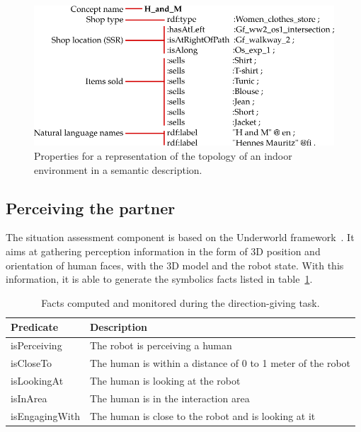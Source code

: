 \documentclass[a4paper,11pt,twoside]{StyleThese}
\begin{document}
\begin{figure}[!ht]
	\centering
	\includegraphics[scale=0.45]{figures/chapter3/zizzi.png}
	\caption{\label{fig:chap3_onto_properties} Properties for a representation of the topology of an indoor environment in a semantic description.}
\end{figure}

\subsection{Perceiving the partner}\label{subsec:situation_assessment}

The situation assessment component is based on the Underworld framework~\cite{lemaignan_2018_underworlds}. It aims at gathering perception information in the form of 3D position and orientation of human faces, with the 3D model and the robot state. With this information, it is able to generate the symbolics facts listed in table~\ref{tab:chap3_predicates}.

\begin{table}[ht!]
	\centering
	\begin{tabularx}{\textwidth}{|l|X|}
		\hline
		\textbf{Predicate} & \textbf{Description} \\
		\hline
		\hline
		isPerceiving & The robot is perceiving a human \\
		\hline
		isCloseTo & The human is within a distance of 0 to 1 meter of the robot \\
		\hline
		isLookingAt & The human is looking at the robot \\
		\hline
		\hline
		isInArea & The human is in the interaction area \\
		\hline
		isEngagingWith & The human is close to the robot and is looking at it \\
		\hline
	\end{tabularx}
	\caption{Facts computed and monitored during the direction-giving task.}
	\label{tab:chap3_predicates}
\end{table}
\end{document}
